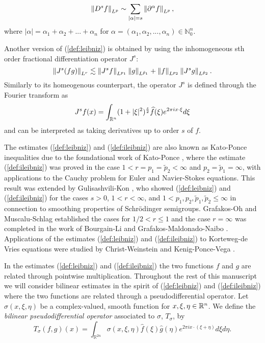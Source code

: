 
\[\left\|D^s f\right\|_{L^p} \sim \sum_{|\alpha| = s} \left\|\partial^\alpha f\right\|_{L^p},\]
where $|\alpha| = \alpha_1 + \alpha_2 + ... + \alpha_n$ for $\alpha = (\alpha_1,\alpha_2,...,\alpha_n) \in \mathbb{N}^n_0.$

 Another version of (\ref{def:leibniz}) is obtained by using the inhomogeneous sth order fractional differentiation operator $J^s$:
\begin{equation}\label{def:ileibniz}
\left\|J^s(fg)\right\|_{L^r} \lesssim \left\|J^s f\right\|_{L^{p_1}}\left\|g\right\|_{L^{\tilde{p}_1}} + \left\|f\right\|_{L^{p_2}}\left\|J^s g\right\|_{L^{\tilde{p}_2}}.
\end{equation}
Similarly to its homeogenous counterpart, the operator $J^s$ is defined through the Fourier transform as 
\[ J^s f(x) = \int_{{{\mathbb R}^n}} (1+|\xi|^2)^\frac{s}{2} \widehat{f}(\xi)e^{2\pi i x\cdot\xi} d\xi\]
and can be interpreted as taking derivatives up to order $s$ of $f$.
 
The estimates (\ref{def:leibniz}) and (\ref{def:ileibniz}) are also known as Kato-Ponce inequalities due to the foundational work of Kato-Ponce \cite{MR951744}, where the estimate (\ref{def:ileibniz}) was proved in the case $1<r=p_1=\tilde{p}_2<\infty$ and $p_2=\tilde{p}_1=\infty$, with applications to the Cauchy problem for Euler and Navier-Stokes equations. This result was extended by Gulisashvili-Kon \cite{MR1420922}, who showed (\ref{def:leibniz}) and (\ref{def:ileibniz}) for the cases $s>0$, $1<r<\infty$, and $1 < p_1,p_2,\tilde{p}_1,\tilde{p}_2\leq\infty$ in connection to smoothing properties of Schr\"odinger semigroups. Grafakos-Oh \cite{MR3200091} and Muscalu-Schlag \cite{MR3052499} established the cases for $1/2 <r\leq 1$ and the case $r=\infty$ was completed in the work of Bourgain-Li \cite{MR3263081} and Grafakos-Maldonado-Naibo \cite{MR3189525}. Applications of the estimates (\ref{def:leibniz}) and (\ref{def:ileibniz}) to Korteweg-de Vries equations were studied by Christ-Weinstein \cite{MR1124294} and Kenig-Ponce-Vega \cite{MR1211741}.

In the estimates (\ref{def:leibniz}) and (\ref{def:ileibniz}) the two functions $f$ and $g$ are related through pointwise multiplication. Throughout the rest of this manuscript we will consider bilinear estimates in the spirit of (\ref{def:leibniz}) and (\ref{def:ileibniz}) where the two functions are related through a pseudodifferential operator. Let $\sigma(x,\xi,\eta)$ be a complex-valued, smooth function for $x,\xi,\eta\in{{\mathbb R}^n}$. We define the \textit{bilinear pseudodifferential operator}  associated to $\sigma$, $T_\sigma$, by 
\begin{equation}\label{psydo}
T_{\sigma}(f,g)(x) = \int_{\mathbb{R}^{2n}} \sigma(x,\xi,\eta) \widehat{f}(\xi)\widehat{g}(\eta)e^{2\pi i x\cdot(\xi+\eta)}d\xi d\eta. 
\end{equation}

